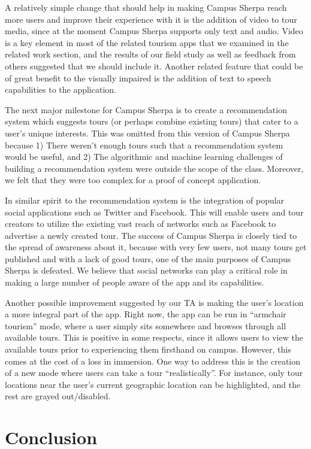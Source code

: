 \documentclass{sigchi}
\begin{document}
A relatively simple change that should help in making Campus Sherpa reach more users and improve their experience with it is the addition of video to tour media, since at the moment Campus Sherpa supports only text and audio. Video is a key element in most of the related tourism apps that we examined in the related work section, and the results of our field study as well as feedback from others suggested that we should include it. Another related feature that could be of great benefit to the visually impaired is the addition of text to speech capabilities to the application. 

The next major milestone for Campus Sherpa is to create a recommendation system which suggests tours (or perhaps combine existing tours) that cater to a user's unique interests. This was omitted from this version of Campus Sherpa because 1) There weren't enough tours such that a recommendation system would be useful, and 2) The algorithmic and machine learning challenges of building a recommendation system were outside the scope of the class. Moreover, we felt that they were too complex for a proof of concept application. 

In similar spirit to the recommendation system is the integration of popular social applications such as Twitter and Facebook. This will enable users and tour creators to utilize the existing vast reach of networks such as Facebook to advertise a newly created tour. The success of Campus Sherpa is closely tied to the spread of awareness about it, because with very few users, not many tours get published and with a lack of good tours, one of the main purposes of Campus Sherpa is defeated. We believe that social networks can play a critical role in making a large number of people aware of the app and its capabilities. 

Another possible improvement suggested by our TA is making the user's location a more integral part of the app. Right now, the app can be run in ``armchair tourism'' mode, where a user simply sits somewhere and browses through all available tours. This is positive in some respects, since it allows users to view the available tours prior to experiencing them firsthand on campus. However, this comes at the cost of a loss in immersion. One way to address this is the creation of a new mode where users can take a tour ``realistically''. For instance, only tour locations near the user's current geographic location can be highlighted, and the rest are grayed out/disabled. 

\section{Conclusion}
\end{document}
